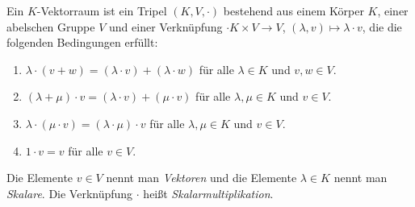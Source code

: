 \begin{defi}
 Ein $K$-Vektorraum ist ein Tripel $(K,V,\cdot)$ bestehend aus einem Körper $K$, einer abelschen Gruppe $V$ und einer Verknüpfung $\cdot K \times V \to V$, $(\lambda, v) \mapsto \lambda \cdot v$, die die folgenden Bedingungen erfüllt:
 \begin{enumerate}[label=\roman*)]
  \item
   $\lambda \cdot (v+w) = (\lambda \cdot v) + (\lambda \cdot w)$ für alle $\lambda \in K$ und $v,w \in V$.
  \item
   $(\lambda + \mu) \cdot v = (\lambda \cdot v) + (\mu \cdot v)$ für alle $\lambda, \mu \in K$ und $v \in V$.
  \item
   $\lambda \cdot (\mu \cdot v) = (\lambda \cdot \mu) \cdot v$ für alle $\lambda, \mu \in K$ und $v \in V$.
  \item
   $1 \cdot v = v$ für alle $v \in V$.
 \end{enumerate}
 Die Elemente $v \in V$ nennt man \emph{Vektoren} und die Elemente $\lambda \in K$ nennt man \emph{Skalare}. Die Verknüpfung $\cdot$ heißt \emph{Skalarmultiplikation}.
\end{defi}


